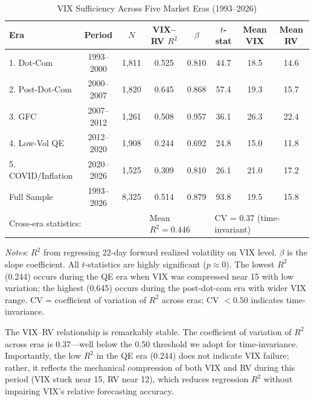 \documentclass[12pt,a4paper]{article}
\begin{document}
\begin{table}[H]
\centering
\small
\begin{threeparttable}
\caption{VIX Sufficiency Across Five Market Eras (1993--2026)}
\label{tab:era_stability}
\begin{tabular}{@{}lccccccc@{}}
\toprule
Era & Period & $N$ & VIX--RV $R^2$ & $\beta$ & $t$-stat & Mean VIX & Mean RV \\
\midrule
1. Dot-Com & 1993--2000 & 1,811 & 0.525 & 0.810 & 44.7 & 18.5 & 14.6 \\
2. Post-Dot-Com & 2000--2007 & 1,820 & 0.645 & 0.868 & 57.4 & 19.3 & 15.7 \\
3. GFC & 2007--2012 & 1,261 & 0.508 & 0.957 & 36.1 & 26.3 & 22.4 \\
4. Low-Vol QE & 2012--2020 & 1,908 & 0.244 & 0.692 & 24.8 & 15.0 & 11.8 \\
5. COVID/Inflation & 2020--2026 & 1,525 & 0.309 & 0.810 & 26.1 & 21.0 & 17.2 \\
\midrule
Full Sample & 1993--2026 & 8,325 & 0.514 & 0.879 & 93.8 & 19.5 & 15.8 \\
\midrule
\multicolumn{3}{l}{Cross-era statistics:} & \multicolumn{2}{l}{Mean $R^2 = 0.446$} & \multicolumn{3}{l}{CV = 0.37 (time-invariant)} \\
\bottomrule
\end{tabular}
\begin{tablenotes}
\small
\item \textit{Notes}: $R^2$ from regressing 22-day forward realized volatility on VIX level. $\beta$ is the slope coefficient. All $t$-statistics are highly significant ($p \approx 0$). The lowest $R^2$ (0.244) occurs during the QE era when VIX was compressed near 15 with low variation; the highest (0.645) occurs during the post-dot-com era with wider VIX range. CV = coefficient of variation of $R^2$ across eras; CV $< 0.50$ indicates time-invariance.
\end{tablenotes}
\end{threeparttable}
\end{table}

The VIX--RV relationship is remarkably stable. The coefficient of variation of $R^2$ across eras is 0.37---well below the 0.50 threshold we adopt for time-invariance. Importantly, the low $R^2$ in the QE era (0.244) does not indicate VIX failure; rather, it reflects the mechanical compression of both VIX and RV during this period (VIX stuck near 15, RV near 12), which reduces regression $R^2$ without impairing VIX's relative forecasting accuracy.
\end{document}

